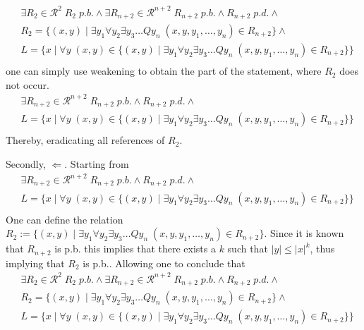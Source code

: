 \documentclass [11pt]{article}
\begin{document}
\begin{enumerate}
\begin{equation*}
\begin{split}
&\exists R_2 \in \mathcal{R}^{2} \; R_2 \; p.b.  \land  \exists R_{n+2}  \in  \mathcal{R}^{n+2} \; R_{n+2} \; p.b. \land R_{n+2} \; p.d. \land  \\
&R_2 = \{(x,y) \mid \exists y_1 \forall y_2\exists y_3\dots Q y_n  \; (x,y,y_1,\ldots,y_n) \in R_{n+2}\}  \land\\ 
& L = \{x \mid \forall y \; (x,y) \in  \{(x,y) \mid  \exists y_1 \forall y_2\exists y_3\dots Q y_n  \; (x,y,y_1,\ldots,y_n) \in R_{n+2}\}\}  \\ 
\end{split}
\end{equation*}
one can simply use weakening to obtain the part of the statement, where $R_2$ does not occur. 
\begin{equation*}
\begin{split}
& \exists R_{n+2}  \in  \mathcal{R}^{n+2} \; R_{n+2} \; p.b. \land R_{n+2} \; p.d. \land  \\
& L = \{x \mid \forall y \; (x,y) \in  \{(x,y) \mid  \exists y_1 \forall y_2\exists y_3\dots Q y_n   \; (x,y,y_1,\ldots,y_n) \in R_{n+2}\}\}  \\ 
\end{split}
\end{equation*}
Thereby, eradicating all references of $R_2$. 

\medskip
Secondly, $\Leftarrow$. Starting from 
\begin{equation*}
\begin{split}
& \exists R_{n+2}  \in  \mathcal{R}^{n+2} \; R_{n+2} \; p.b. \land R_{n+2} \; p.d. \land  \\
& L = \{x \mid \forall y \; (x,y) \in  \{(x,y) \mid  \exists y_1 \forall y_2\exists y_3\dots Q y_n  \; (x,y,y_1,\ldots,y_n) \in R_{n+2}\}\}  \\ 
\end{split}
\end{equation*}
One can define the relation $R_2:=\{(x,y) \mid  \exists y_1 \forall y_2\exists y_3\dots Q y_n   \; (x,y,y_1,\ldots,y_n) \in R_{n+2}\} $.
Since it is known that $R_{n+2}$ is p.b. this implies that there exists a $k$ such that $|y| \leq |x|^k$, thus implying that $R_2$ is p.b..
Allowing one to conclude that
\begin{equation*}
\begin{split}
&\exists R_2 \in \mathcal{R}^{2} \; R_2 \; p.b.  \land  \exists R_{n+2}  \in  \mathcal{R}^{n+2} \; R_{n+2} \; p.b. \land R_{n+2} \; p.d. \land  \\
&R_2 = \{(x,y) \mid  \exists y_1 \forall y_2\exists y_3\dots Q y_n  \; (x,y,y_1,\ldots,y_n) \in R_{n+2}\}  \land\\ 
& L = \{x \mid \forall y \; (x,y) \in  \{(x,y) \mid  \exists y_1 \forall y_2\exists y_3\dots Q y_n  \; (x,y,y_1,\ldots,y_n) \in R_{n+2}\}\}  \\ 
\end{split}
\end{equation*}


\end{enumerate}
\end{document}

